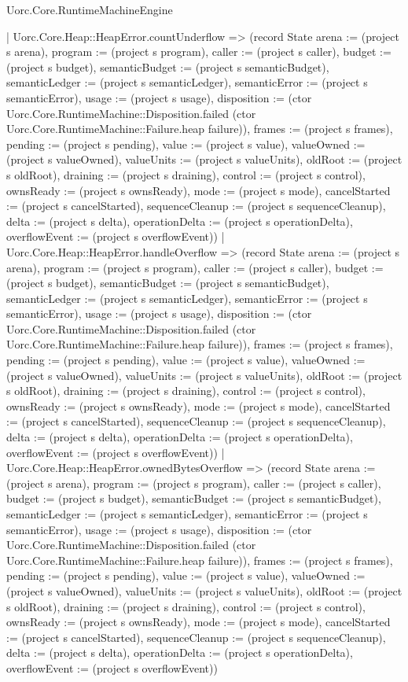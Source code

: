 \begin{lexlean}{Uorc.Core.RuntimeMachineEngine}
\begin{semanticmodule}
{    | Uorc.Core.Heap::HeapError.countUnderflow => (record State {arena := (project s arena), program := (project s program), caller := (project s caller), budget := (project s budget), semanticBudget := (project s semanticBudget), semanticLedger := (project s semanticLedger), semanticError := (project s semanticError), usage := (project s usage), disposition := (ctor Uorc.Core.RuntimeMachine::Disposition.failed (ctor Uorc.Core.RuntimeMachine::Failure.heap failure)), frames := (project s frames), pending := (project s pending), value := (project s value), valueOwned := (project s valueOwned), valueUnits := (project s valueUnits), oldRoot := (project s oldRoot), draining := (project s draining), control := (project s control), ownsReady := (project s ownsReady), mode := (project s mode), cancelStarted := (project s cancelStarted), sequenceCleanup := (project s sequenceCleanup), delta := (project s delta), operationDelta := (project s operationDelta), overflowEvent := (project s overflowEvent)})
    | Uorc.Core.Heap::HeapError.handleOverflow => (record State {arena := (project s arena), program := (project s program), caller := (project s caller), budget := (project s budget), semanticBudget := (project s semanticBudget), semanticLedger := (project s semanticLedger), semanticError := (project s semanticError), usage := (project s usage), disposition := (ctor Uorc.Core.RuntimeMachine::Disposition.failed (ctor Uorc.Core.RuntimeMachine::Failure.heap failure)), frames := (project s frames), pending := (project s pending), value := (project s value), valueOwned := (project s valueOwned), valueUnits := (project s valueUnits), oldRoot := (project s oldRoot), draining := (project s draining), control := (project s control), ownsReady := (project s ownsReady), mode := (project s mode), cancelStarted := (project s cancelStarted), sequenceCleanup := (project s sequenceCleanup), delta := (project s delta), operationDelta := (project s operationDelta), overflowEvent := (project s overflowEvent)})
    | Uorc.Core.Heap::HeapError.ownedBytesOverflow => (record State {arena := (project s arena), program := (project s program), caller := (project s caller), budget := (project s budget), semanticBudget := (project s semanticBudget), semanticLedger := (project s semanticLedger), semanticError := (project s semanticError), usage := (project s usage), disposition := (ctor Uorc.Core.RuntimeMachine::Disposition.failed (ctor Uorc.Core.RuntimeMachine::Failure.heap failure)), frames := (project s frames), pending := (project s pending), value := (project s value), valueOwned := (project s valueOwned), valueUnits := (project s valueUnits), oldRoot := (project s oldRoot), draining := (project s draining), control := (project s control), ownsReady := (project s ownsReady), mode := (project s mode), cancelStarted := (project s cancelStarted), sequenceCleanup := (project s sequenceCleanup), delta := (project s delta), operationDelta := (project s operationDelta), overflowEvent := (project s overflowEvent)})
}
\end{semanticmodule}
\end{lexlean}
